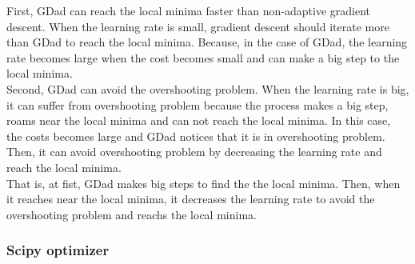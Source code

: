 \documentclass[a4paper]{article}
\begin{document}
First, GDad can reach the local minima faster than non-adaptive gradient descent. When the learning rate is small, gradient descent should iterate more than GDad to reach the local minima. Because, in the case of GDad, the learning rate becomes large when the cost becomes small and can make a big step to the local minima.\\
Second, GDad can avoid the overshooting problem. When the learning rate is big, it can suffer from overshooting problem because the process makes a big step, roams near the local minima and can not reach the local minima. In this case, the costs becomes large and GDad notices that it is in overshooting problem. Then, it can avoid overshooting problem by decreasing the learning rate and reach the local minima. \\
That is, at fist, GDad makes big steps to find the the local minima. Then, when it reaches near the local minima, it decreases the learning rate to avoid the overshooting problem and reachs the local minima.


\subsubsection{Scipy optimizer}
\end{document}
